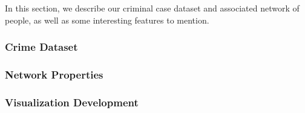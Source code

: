 In this section, we describe our criminal case dataset and associated network of people, as well as some interesting features to mention.

\subsubsection{Crime Dataset}

\subsubsection{Network Properties}

\subsubsection{Visualization Development}

